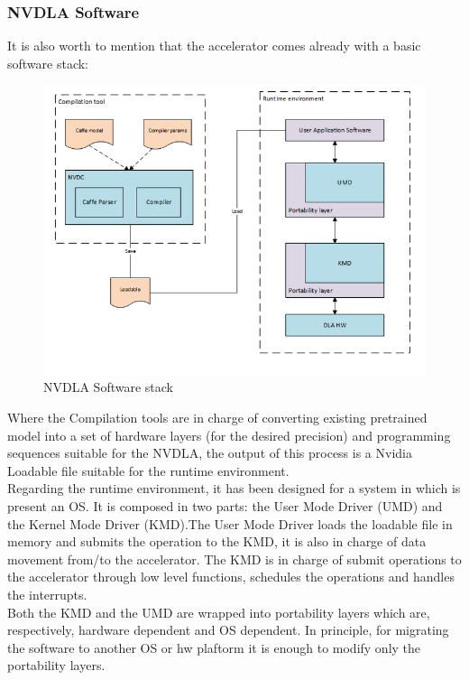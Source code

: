 \subsubsection{ NVDLA Software }
It is also worth to mention that the accelerator comes already with a basic software stack:
\begin{figure}[H]
\centering
\captionsetup{justification=centering}
\includegraphics[scale=0.8]{./figure/nvdla_software.PNG}
\caption{NVDLA Software stack}
\label{fig:nvdlasw}
\end{figure}

Where the Compilation tools are in charge of converting existing pretrained model into a set of hardware layers (for the desired precision) and programming sequences suitable for the NVDLA, the output of this process is a Nvidia Loadable file suitable for the runtime environment.\\
Regarding the runtime environment, it has been designed for a system in which is present an OS. It is composed in two parts: the User Mode Driver (UMD) and the Kernel Mode Driver (KMD).\newline The User Mode Driver loads the loadable file in memory and submits the operation to the KMD, it is also in charge of data movement from/to the accelerator. \newline The KMD is in charge of submit operations to the accelerator through low level functions, schedules the operations and handles the interrupts.\\
Both the KMD and the UMD are wrapped into portability layers which are, respectively, hardware dependent and OS dependent. In principle, for migrating the software to another OS or hw plaftorm it is enough to modify only the portability layers.
\newpage
